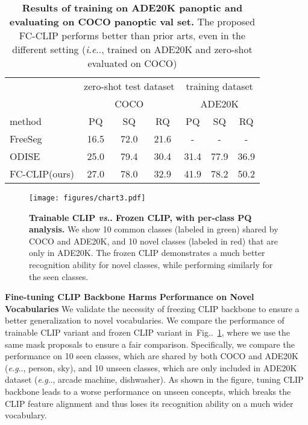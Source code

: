 \documentclass{article}
\makeatletter
\DeclareRobustCommand\onedot{\futurelet\@let@token\@onedot}
\def\@onedot{\ifx\@let@token.\else.\null\fi\xspace}
\def\eg{\emph{e.g}\onedot}
\def\ie{\emph{i.e}\onedot}
\def\vs{\emph{vs}\onedot}
\newcommand{\figref}[1]{Fig\onedot~\ref{#1}}
\newcommand{\modelname}{FC-CLIP\xspace}
\newcommand{\tablestyle}[2]{\setlength{\tabcolsep}{#1}\renewcommand{\arraystretch}{#2}\centering\footnotesize}
\makeatother
\begin{document}
\begin{table}[!t]
\tablestyle{6pt}{1.1}
\caption{
\textbf{Results of training on ADE20K panoptic and evaluating on COCO panoptic val set.} The proposed \modelname performs better than prior arts, even in the different setting (\ie, trained on ADE20K and zero-shot evaluated on COCO)
}
\label{tab:train_with_ade}
\begin{tabular}{l|ccc|ccc}

& \multicolumn{3}{c|}{zero-shot test dataset}                & \multicolumn{3}{c}{training dataset}          \\

                              & \multicolumn{3}{c|}{COCO}                & \multicolumn{3}{c}{ADE20K}          \\
   method                    & PQ            & SQ            & RQ            & PQ            & SQ            & RQ            \\
   \shline
   FreeSeg~\cite{qin2023freeseg} & 16.5 & 72.0 & 21.6 & - & - & - \\
   ODISE~\cite{xu2023open} & 25.0 & 79.4 & 30.4 & 31.4 & 77.9 & 36.9 \\
   \hline \hline
   \modelname (ours)  & 27.0 & 78.0 & 32.9 & 41.9 & 78.2 & 50.2 \\ 
\end{tabular}
\end{table}


\begin{figure}[!t]
    \centering
    \vspace{-12ex}
    \texttt{[image: figures/chart3.pdf]}
    \vspace{-15ex}
    \caption{
    \textbf{Trainable CLIP \vs Frozen CLIP, with per-class PQ analysis.} We show 10 common classes (labeled in \textcolor{mygreen}{green}) shared by COCO and ADE20K, and 10 novel classes (labeled in \textcolor{myred}{red}) that are only in ADE20K. The frozen CLIP demonstrates a much better recognition ability for novel classes, while performing similarly for the seen classes.
    }
    \label{fig:frozen_vs_trainable}
\end{figure}


\noindent \textbf{Fine-tuning CLIP Backbone Harms Performance on Novel Vocabularies}\quad
We validate the necessity of freezing CLIP backbone to ensure a better generalization to novel vocabularies. We compare the performance of trainable CLIP variant and frozen CLIP variant in~\figref{fig:frozen_vs_trainable}, where we use the same mask proposals to ensure a fair comparison. Specifically, we compare the performance on 10 seen classes, which are shared by both COCO and ADE20K (\eg, person, sky), and 10 unseen classes, which are only included in ADE20K dataset (\eg, arcade machine, dishwasher). As shown in the figure, tuning CLIP backbone leads to a worse performance on unseen concepts, which breaks the CLIP feature alignment and thus loses its recognition ability on a much wider vocabulary. \vspace{-1ex}
\end{document}
